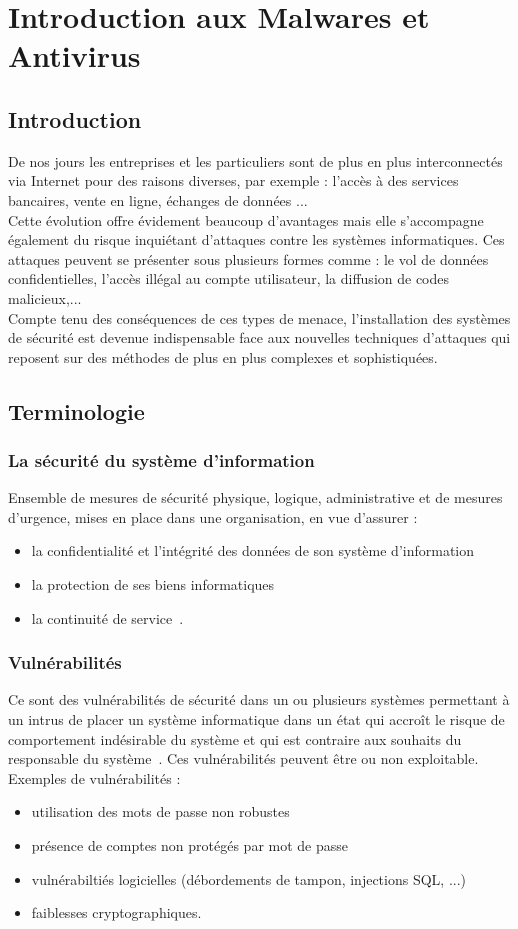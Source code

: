 \chapter{Introduction aux Malwares et Antivirus}
\section{Introduction}
De nos jours les entreprises et les particuliers sont de plus en plus interconnectés via Internet pour des raisons diverses, par exemple : l'accès à des services bancaires, vente en ligne, échanges de données ...\\
Cette évolution offre évidement beaucoup d'avantages mais elle s'accompagne également du risque inquiétant d'attaques contre les systèmes informatiques. Ces attaques peuvent se présenter sous plusieurs formes comme : le vol de données confidentielles, l'accès illégal au compte utilisateur, la diffusion de codes malicieux,...\\
Compte tenu des conséquences de ces types de menace, l'installation des systèmes de sécurité est devenue indispensable face aux nouvelles techniques d'attaques qui reposent sur des méthodes de plus en plus complexes et sophistiquées.
\section{Terminologie}
\subsection{La sécurité du système d'information}
Ensemble de mesures de sécurité physique, logique, administrative et de mesures d'urgence, mises en place dans une organisation, en vue d'assurer :
\begin{itemize}
\item la confidentialité et l'intégrité des données de son système d'information
\item la protection de ses biens informatiques
\item la continuité de service~\cite{sec}.
\end{itemize}
\subsection{Vulnérabilités}
Ce sont des vulnérabilités de sécurité dans un ou plusieurs systèmes permettant à un intrus de placer un système informatique dans un état qui accroît le risque de comportement indésirable du système et qui est contraire aux souhaits du responsable du système~\cite{vuln}. Ces vulnérabilités peuvent être ou non exploitable.\\
Exemples de vulnérabilités :
\begin{itemize}
\item utilisation des mots de passe non robustes
\item présence de comptes non protégés par mot de passe
\item vulnérabiltiés logicielles (débordements de tampon, injections SQL, ...)
\item faiblesses cryptographiques.
\end{itemize}
